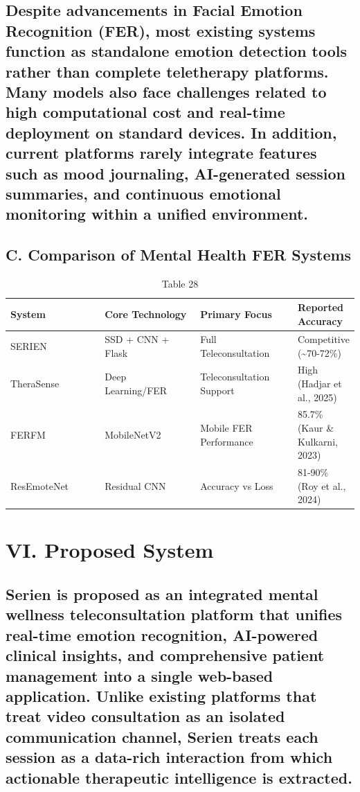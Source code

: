 \documentclass[conference]{IEEEtran}
\begin{document}
\subsection{Despite advancements in Facial Emotion Recognition (FER), most existing systems function as standalone emotion detection tools rather than complete teletherapy platforms. Many models also face challenges related to high computational cost and real-time deployment on standard devices. In addition, current platforms rarely integrate features such as mood journaling, AI-generated session summaries, and continuous emotional monitoring within a unified environment.}
\subsection{C. Comparison of Mental Health FER Systems}
\begin{table}[t]
\centering
\caption{Table 28}
\begin{tabular}{|p{0.3\linewidth}|p{0.3\linewidth}|p{0.3\linewidth}|p{0.3\linewidth}|}
\hline
System & Core Technology & Primary Focus & Reported Accuracy \\
\hline
SERIEN & SSD + CNN + Flask & Full Teleconsultation & Competitive (\textasciitilde{}70-72\%) \\
\hline
TheraSense & Deep Learning/FER & Teleconsultation Support & High (Hadjar et al., 2025) \\
\hline
FERFM & MobileNetV2 & Mobile FER Performance & 85.7\% (Kaur \& Kulkarni, 2023) \\
\hline
ResEmoteNet & Residual CNN & Accuracy vs Loss & 81-90\% (Roy et al., 2024) \\
\hline
\end{tabular}
\end{table}
\section{VI. Proposed System}
\subsection{Serien is proposed as an integrated mental wellness teleconsultation platform that unifies real-time emotion recognition, AI-powered clinical insights, and comprehensive patient management into a single web-based application. Unlike existing platforms that treat video consultation as an isolated communication channel, Serien treats each session as a data-rich interaction from which actionable therapeutic intelligence is extracted.}
\end{document}
